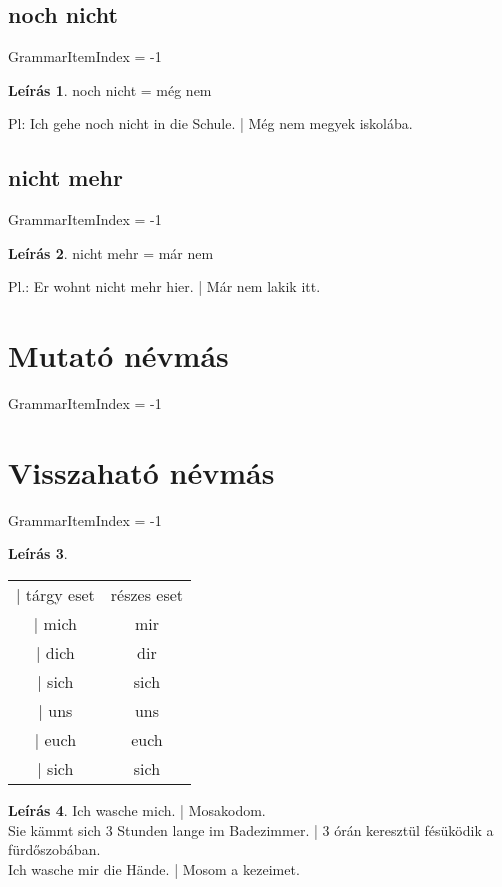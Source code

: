 \documentclass{article}
\theoremstyle{definition}
\newtheorem*{desc}{Leírás}
\begin{document}
\subsection{noch nicht}

GrammarItemIndex = -1

\begin{desc}
noch nicht = még nem

Pl: Ich gehe noch nicht in die Schule. | Még nem megyek iskolába.
\end{desc}

\subsection{nicht mehr}

GrammarItemIndex = -1

\begin{desc}
nicht mehr = már nem

Pl.: Er wohnt nicht mehr hier. | Már nem lakik itt.
\end{desc}

\section{Mutató névmás}

GrammarItemIndex = -1

\section{Visszaható névmás}

GrammarItemIndex = -1

\begin{desc}
\begin{tabular}{cc}
 | tárgy eset & részes eset \\
 | mich & mir \\
 | dich & dir \\
 | sich & sich \\
 | uns & uns \\
 | euch & euch \\
 | sich & sich \\
\end{tabular}
\end{desc}

\begin{desc}
Ich wasche mich. | Mosakodom. \\
Sie kämmt sich 3 Stunden lange im Badezimmer. | 3 órán keresztül fésüködik a fürdőszobában.\\
Ich wasche mir die Hände. | Mosom a kezeimet.
\end{desc}
\end{document}
